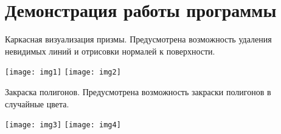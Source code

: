 \graphicspath{{png/}}

\section{Демонстрация работы программы}

Каркасная визуализация призмы. Предусмотрена возможность удаления невидимых линий и отрисовки нормалей к поверхности.

\texttt{[image: img1]}
\texttt{[image: img2]}

Закраска полигонов. Предусмотрена возможность закраски полигонов в случайные цвета.

\texttt{[image: img3]}
\texttt{[image: img4]}
\pagebreak
